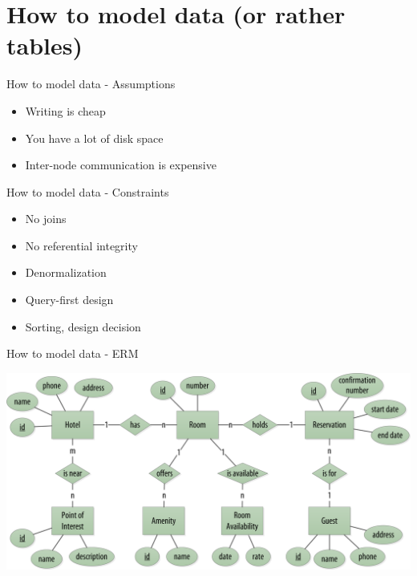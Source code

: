 \documentclass[
  10pt
]{beamer}
\begin{document}
\section{How to model data (or rather tables)}  %

\begin{frame}{How to model data - Assumptions \cite{hobbs_datamodeling, guru99_modeling}}
  \begin{itemize}
    \item Writing is cheap
    \item You have a lot of disk space
    \item Inter-node communication is expensive
  \end{itemize}
\end{frame}

\begin{frame}{How to model data - Constraints}
  \begin{itemize}
    \item<+-> No joins
    \item<+-> No referential integrity
    \item<+-> Denormalization
    \item<+-> Query-first design
    \item<+-> Sorting, design decision
  \end{itemize}
\end{frame}

\begin{frame}{How to model data - ERM \cite{cassandra_oreilly}}
  \begin{center}
    \includegraphics[width=0.75\columnwidth]{resources/model_example_entity_relation_step0.png}
  \end{center}
\end{frame}
\end{document}
